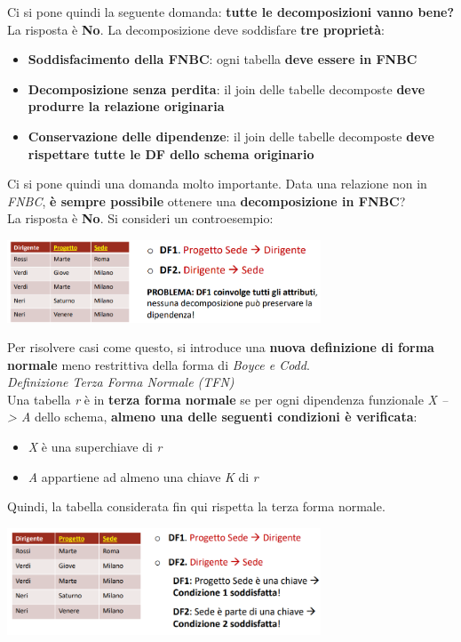 \documentclass{article}
\begin{document}
Ci si pone quindi la seguente domanda: \textbf{tutte le decomposizioni vanno bene?}\\
La risposta è \textbf{No}. La decomposizione deve soddisfare \textbf{tre proprietà}:
\begin{itemize}[label={-}, leftmargin=1cm]
    \itemsep0em
    \item \textbf{Soddisfacimento della FNBC}: ogni tabella \textbf{deve essere in FNBC}
    \item \textbf{Decomposizione senza perdita}: il join delle tabelle decomposte \textbf{deve produrre la relazione originaria}
    \item \textbf{Conservazione delle dipendenze}: il join delle tabelle decomposte \textbf{deve rispettare tutte le DF dello schema originario}
\end{itemize}
Ci si pone quindi una domanda molto importante. Data una relazione non in \textit{FNBC}, \textbf{è sempre possibile} ottenere una \textbf{decomposizione in FNBC}?\\
La risposta è \textbf{No}. Si consideri un controesempio:
\begin{center}
    \includegraphics[width=0.7\textwidth]{foto9.png}
\end{center}
Per risolvere casi come questo, si introduce una \textbf{nuova definizione di forma normale} meno restrittiva della forma di \textit{Boyce e Codd}.\vspace{14pt}\\
\textit{Definizione Terza Forma Normale (TFN)}\\
Una tabella \textit{r} è in \textbf{terza forma normale} se per ogni dipendenza funzionale \textit{X --> A} dello schema, \textbf{almeno una delle seguenti condizioni è verificata}:
\begin{itemize}[label={-}, leftmargin=1cm]
    \itemsep0em
    \item \textit{X} è una superchiave di \textit{r}
    \item \textit{A} appartiene ad almeno una chiave \textit{K} di \textit{r}
\end{itemize}
Quindi, la tabella considerata fin qui rispetta la terza forma normale.
\begin{center}
    \includegraphics[width=0.7\textwidth]{foto10.png}
\end{center}
\end{document}
